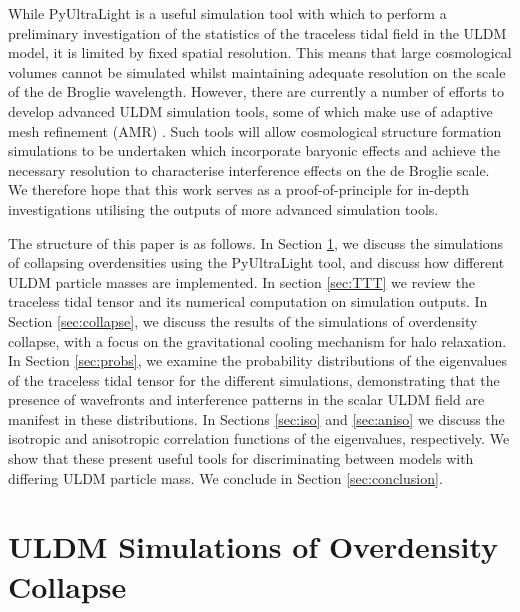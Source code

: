 \documentclass[a4paper,11pt]{article}
\begin{document}
While {\sc PyUltraLight} is a useful simulation tool with which to perform a preliminary investigation of the statistics of the traceless tidal field in the ULDM model, it is limited by fixed spatial resolution. This means that large cosmological volumes cannot be simulated whilst maintaining adequate resolution on the scale of the de Broglie wavelength. However, there are currently a number of efforts to develop advanced ULDM simulation tools, some of which make use of adaptive mesh refinement (AMR) \cite{Mocz:2019emo, Niemeyer:2019aqm, Veltmaat:2019hou}. Such tools will allow cosmological structure formation simulations to be undertaken which incorporate baryonic effects and achieve the necessary resolution to characterise interference effects on the de Broglie scale. We therefore hope that this work serves as a proof-of-principle for in-depth investigations utilising the outputs of more advanced simulation tools. 

The structure of this paper is as follows. In Section \ref{sec:sims}, we discuss the simulations of collapsing overdensities using the {\sc PyUltraLight} tool, and discuss how different ULDM particle masses are implemented. In section \ref{sec:TTT} we review the traceless tidal tensor and its numerical computation on simulation outputs. In Section \ref{sec:collapse}, we discuss the results of the simulations of overdensity collapse, with a focus on the gravitational cooling mechanism for halo relaxation. In Section \ref{sec:probs}, we examine the probability distributions of the eigenvalues of the traceless tidal tensor for the different simulations, demonstrating that the presence of wavefronts and interference patterns in the scalar ULDM field are manifest in these distributions. In Sections \ref{sec:iso} and \ref{sec:aniso} we discuss the isotropic and anisotropic correlation functions of the eigenvalues, respectively. We show that these present useful tools for discriminating between models with differing ULDM particle mass. We conclude in Section \ref{sec:conclusion}.
    


\section{ULDM Simulations of Overdensity Collapse}\label{sec:sims}
\end{document}
